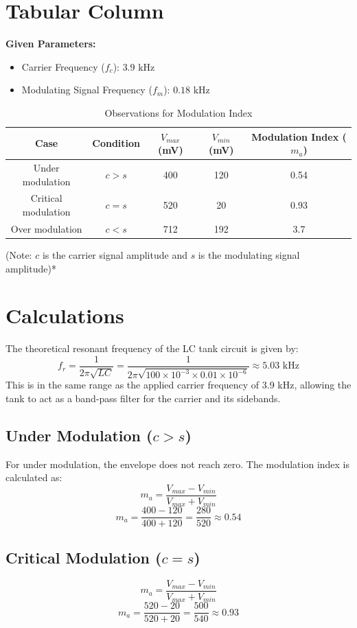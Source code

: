 \documentclass[12pt,a4paper]{article}
\begin{document}
\section{Tabular Column}
\textbf{Given Parameters:}
\begin{itemize}
    \item Carrier Frequency ($f_c$): $3.9 \text{ kHz}$
    \item Modulating Signal Frequency ($f_m$): $0.18 \text{ kHz}$
\end{itemize}

\begin{table}[H]
\centering
\begin{tabular}{|c|c|c|c|c|}
\hline
\textbf{Case} & \textbf{Condition} & \textbf{$V_{max}$ (mV)} & \textbf{$V_{min}$ (mV)} & \textbf{Modulation Index ($m_a$)} \\
\hline
Under modulation & $c > s$ & 400 & 120 & 0.54 \\
Critical modulation & $c = s$ & 520 & 20 & 0.93 \\
Over modulation & $c < s$ & 712 & 192 & 3.7 \\
\hline
\end{tabular}
\caption{Observations for Modulation Index}
\end{table}
\noindent*(Note: $c$ is the carrier signal amplitude and $s$ is the modulating signal amplitude)*

\section{Calculations}
The theoretical resonant frequency of the LC tank circuit is given by:
$$f_r = \frac{1}{2\pi\sqrt{LC}} = \frac{1}{2\pi\sqrt{100 \times 10^{-3} \times 0.01 \times 10^{-6}}} \approx 5.03 \text{ kHz}$$
This is in the same range as the applied carrier frequency of 3.9 kHz, allowing the tank to act as a band-pass filter for the carrier and its sidebands.

\subsection{Under Modulation ($c > s$)}
For under modulation, the envelope does not reach zero. The modulation index is calculated as:
$$m_a = \frac{V_{max} - V_{min}}{V_{max} + V_{min}}$$
$$m_a = \frac{400 - 120}{400 + 120} = \frac{280}{520} \approx 0.54$$

\subsection{Critical Modulation ($c = s$)}
$$m_a = \frac{V_{max} - V_{min}}{V_{max} + V_{min}}$$
$$m_a = \frac{520 - 20}{520 + 20} = \frac{500}{540} \approx 0.93$$
\end{document}
